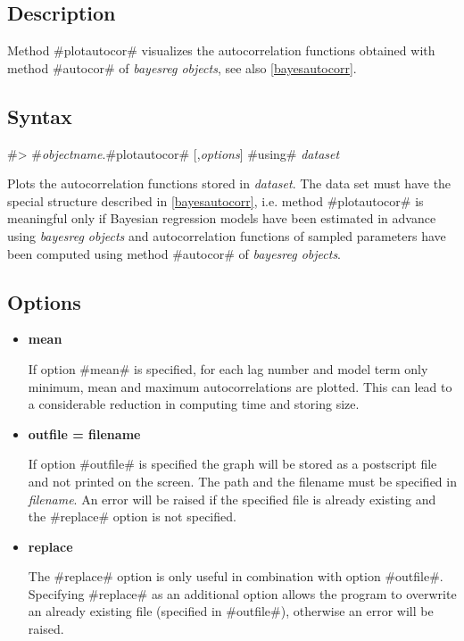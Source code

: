 \subsection*{Description}

Method #plotautocor# visualizes the autocorrelation functions
obtained with method #autocor# of {\em bayesreg objects}, see also
\autoref{bayesautocorr}.


\subsection*{Syntax}

#> #{\em objectname}.#plotautocor# [,{\em options}] #using# {\em dataset}

Plots the autocorrelation functions stored in {\em dataset}. The
data set must have the special structure described in
\autoref{bayesautocorr}, i.e. method #plotautocor# is meaningful
only if Bayesian regression models have been estimated in advance
using {\em bayesreg objects} and autocorrelation functions of
sampled parameters have been computed using method #autocor# of
{\em bayesreg objects}.

\subsection*{Options}

\begin{itemize}
\item {\bf mean}

If option #mean# is specified, for each lag number and model term
only minimum, mean and maximum autocorrelations are plotted. This
can lead to a considerable reduction in computing time and storing
size.

\item {\bf outfile = filename}

If option #outfile# is specified the graph will be stored as a
postscript file and not printed on the screen. The path and the
filename must be specified in {\em filename}. An error will be
raised if the specified file is already existing and the #replace#
option is not specified. \item {\bf replace}

The #replace# option is only useful in combination with option
#outfile#. Specifying #replace# as an additional option allows the
program to overwrite an already existing file (specified in
#outfile#), otherwise an error will be raised.
\end{itemize}

